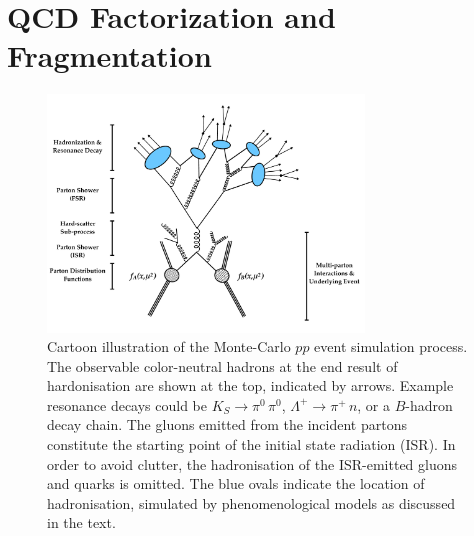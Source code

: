 

\section{QCD Factorization and Fragmentation}
\label{sec:fact_frag}

\begin{figure}[!htb]
    \begin{center}
        \includegraphics[width=0.75\textwidth]{figures/event_simulation/pp_sim_cartoonPDF}
        \caption{
            Cartoon illustration of the Monte-Carlo $pp$ event simulation process.
            The observable color-neutral hadrons at the end result of hardonisation are shown at the
            top, indicated by arrows.
            Example resonance decays could be $K_S \rightarrow \pi^0\,\pi^0$, $\Lambda^+ \rightarrow \pi^+\,n$, or a
            $B$-hadron decay chain.
            The gluons emitted from the incident partons constitute the starting point of the initial state radiation (ISR).
            In order to avoid clutter, the hadronisation of the ISR-emitted gluons and quarks is omitted.
            The blue ovals indicate the location of hadronisation, simulated by phenomenological models as discussed in the text.
        }
        \label{fig:pp_sim_steps}
    \end{center}
\end{figure}


